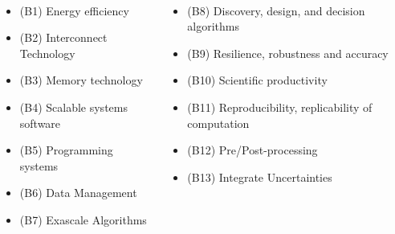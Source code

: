 \begin{frame}[fragile=singleslide]{\insertsectionhead}
  \framesubtitle{\insertsubsectionhead}
  \footnotesize
  \begin{columns}[]
    \begin{column}{.5\linewidth}
      \begin{itemize}
        \item (B1) Energy efficiency
        \item (B2) Interconnect Technology
        \item (B3) Memory technology
        \item (B4) Scalable systems software
        \item (B5) Programming systems
        \item (B6) Data Management
        \item (B7) Exascale Algorithms
      \end{itemize}
    \end{column}
    \begin{column}{.5\linewidth}
      \begin{itemize}
        \item (B8) Discovery, design, and decision algorithms
        \item (B9) Resilience, robustness and accuracy
        \item (B10) Scientific productivity
        \item (B11) Reproducibility, replicability of computation
        \item (B12) Pre/Post-processing
        \item (B13) Integrate Uncertainties
      \end{itemize}
    \end{column}
  \end{columns}

  
\end{frame}


